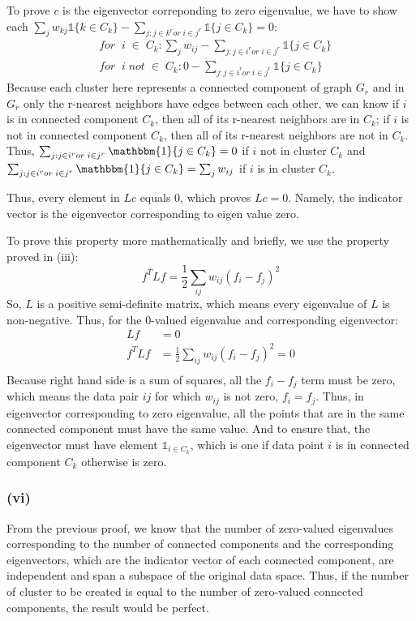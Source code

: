 \documentclass[]{homework}
\begin{document}
To prove $c$ is the eigenvector correponding to zero eigenvalue, we have to show each $\sum_j w_{kj} \mathbb{1}\{k\in C_k\} - \sum_{j: j\in k^r or\;i \in j^r} \mathbb{1}\{j\in C_k\} = 0$:
\begin{equation}
    \begin{aligned}
    &for\;\;i\;\in\;C_k:\sum_j w_{ij} - \sum_{j: j\in i^r or\;i \in j^r} \mathbb{1}\{j\in C_k\}\\
    &for\;\;i\;not\;\in\;C_k:0 - \sum_{j: j\in i^r or\;i \in j^r} \mathbb{1}\{j\in C_k\}
    \end{aligned}
\end{equation}
Because each cluster here represents a connected component of graph $G_r$ and in $G_r$ only the r-nearest neighbors have edges between each other, we can know if $i$ is in connected component $C_k$, then all of its r-nearest neighbors are in $C_k$; if $i$ is not in connected component $C_k$, then all of its r-nearest neighbors are not in $C_k$. Thus, $\sum_{j: j\in i^r or\;i \in j^r} \mathbbm{1}\{j\in C_k\} = 0$ if $i$ not in cluster $C_k$ and $\sum_{j: j\in i^r or\;i \in j^r} \mathbbm{1}\{j\in C_k\} = \sum_j w_{ij}$ if $i$ is in cluster $C_k$.

Thus, every element in $ L c$ equals 0, which proves $Lc = 0$. Namely, the indicator vector is the eigenvector corresponding to eigen value zero.

To prove this property more mathematically and briefly, we use the property proved in (iii):
$$ f^T Lf = \frac{1}{2} \sum_{ij} w_{ij} (f_i - f_j)^2$$
So, $L$ is a positive semi-definite matrix, which means every eigenvalue of $L$ is non-negative. Thus, for the 0-valued eigenvalue and corresponding eigenvector:
\begin{equation}
    \begin{aligned}
            Lf &=0\\
            f^T Lf &= \frac{1}{2} \sum_{ij} w_{ij} (f_i - f_j)^2 =0\\
    \end{aligned}
\end{equation}
Because right hand side is a sum of squares, all the $f_i - f_j$ term must be zero, which means the data pair $ij$ for which $w_{ij}$ is not zero, $f_i = f_j$. Thus, in eigenvector corresponding to zero eigenvalue, all the points that are in the same connected component must have the same value. And to ensure that, the eigenvector must have element $\mathbb{1}_{i \in C_k}$, which is one if data point $i$ is in connected component $C_k$ otherwise is zero.
\subsubsection*{(vi)}
From the previous proof, we know that the number of zero-valued eigenvalues corresponding to the number of connected components and the corresponding eigenvectors, which are the indicator vector of each connected component, are independent and span a subspace of the original data space. Thus, if the number of cluster to be created is equal to the number of zero-valued connected components, the result would be perfect.
\end{document}
